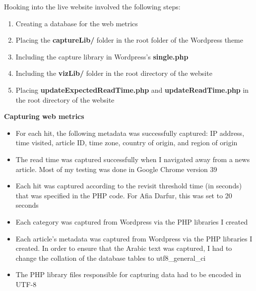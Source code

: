 \documentclass[12pt]{article}
\begin{document}
{\newpage

Hooking into the live website involved the following steps:
\begin{enumerate}
\item Creating a database for the web metrics
\item Placing the \textbf{captureLib/} folder in the root folder of the Wordpress theme
\item Including the capture library in Wordpress's \textbf{single.php} 
\item Including the \textbf{vizLib/} folder in the root directory of the website
\item Placing \textbf{updateExpectedReadTime.php} and \textbf{updateReadTime.php} in the root directory of the website 
\end{enumerate}

\vspace{0.2in}

\noindent\textbf{Capturing web metrics} 
\begin{itemize}
\item For each hit, the following metadata was successfully captured: IP address, time visited, article ID, time zone, country of origin, and region of origin
\item  The read time was captured successfully when I navigated away from a news article. Most of my testing was done in Google Chrome version 39
\item Each hit was captured according to the revisit threshold time (in seconds) that was specified in the PHP code. For Afia Darfur, this was set to 20 seconds
\item Each category was captured from Wordpress via the PHP libraries I created
\item Each article's metadata was captured from Wordpress via the PHP libraries I created. In order to ensure that the Arabic text was captured, I had to change the collation of the database tables to utf8\_general\_ci
\item The PHP library files responsible for capturing data had to be encoded in UTF-8
\end{itemize}

\vspace{0.2in}

}
\end{document}
